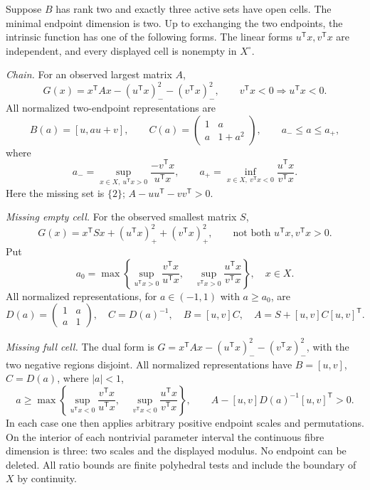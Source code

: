 \begin{theorem}\label{thm:three-cells}
Suppose $B$ has rank two and exactly three active sets have open cells.
The minimal endpoint dimension is two. Up to exchanging the two endpoints,
the intrinsic function has one of the following forms. The linear forms
$u^{\mathsf T}x,v^{\mathsf T}x$ are independent, and every displayed cell
is nonempty in $X^\circ$.

\emph{Chain.} For an observed largest matrix $A$,
\begin{equation}\label{eq:chain-normal}
 G(x)=x^{\mathsf T}Ax-(u^{\mathsf T}x)_-^2-(v^{\mathsf T}x)_-^2,
 \qquad v^{\mathsf T}x<0\Longrightarrow u^{\mathsf T}x<0.
\end{equation}
All normalized two-endpoint representations are
\begin{equation}\label{eq:chain-fibre}
 B(a)=[u,au+v],\qquad C(a)=
 \begin{pmatrix}1&a\\a&1+a^2\end{pmatrix},\qquad a_-\le a\le a_+,
\end{equation}
where
\[
 a_-=\sup_{x\in X,\ u^{\mathsf T}x>0}
       \frac{-v^{\mathsf T}x}{u^{\mathsf T}x},\qquad
 a_+=\inf_{x\in X,\ v^{\mathsf T}x<0}
       \frac{u^{\mathsf T}x}{v^{\mathsf T}x}.
\]
Here the missing set is $\{2\}$; $A-uu^{\mathsf T}-vv^{\mathsf T}>0$.

\emph{Missing empty cell.} For the observed smallest matrix $S$,
\begin{equation}\label{eq:fork-normal}
 G(x)=x^{\mathsf T}Sx+(u^{\mathsf T}x)_+^2+(v^{\mathsf T}x)_+^2,
 \qquad \text{not both }u^{\mathsf T}x,v^{\mathsf T}x>0.
\end{equation}
Put
\[
 a_0=\max\left\{
 \sup_{u^{\mathsf T}x>0}\frac{v^{\mathsf T}x}{u^{\mathsf T}x},\quad
 \sup_{v^{\mathsf T}x>0}\frac{u^{\mathsf T}x}{v^{\mathsf T}x}\right\},
 \quad x\in X.
\]
All normalized representations, for $a\in(-1,1)$ with $a\ge a_0$, are
\begin{equation}\label{eq:fork-fibre}
 D(a)=\begin{pmatrix}1&a\\a&1\end{pmatrix},\quad C=D(a)^{-1},\quad
 B=[u,v]C,\quad A=S+[u,v]C[u,v]^{\mathsf T}.
\end{equation}

\emph{Missing full cell.} The dual form is
$G=x^{\mathsf T}Ax-(u^{\mathsf T}x)_-^2-(v^{\mathsf T}x)_-^2$,
with the two negative regions disjoint. All normalized representations have
$B=[u,v]$, $C=D(a)$, where $|a|<1$,
\[
 a\ge\max\left\{
 \sup_{u^{\mathsf T}x<0}\frac{v^{\mathsf T}x}{u^{\mathsf T}x},\quad
 \sup_{v^{\mathsf T}x<0}\frac{u^{\mathsf T}x}{v^{\mathsf T}x}\right\},
 \qquad A-[u,v]D(a)^{-1}[u,v]^{\mathsf T}>0.
\]
In each case one then applies arbitrary positive endpoint scales and
permutations. On the interior of each nontrivial parameter interval the
continuous fibre dimension is three: two scales and the displayed modulus.
No endpoint can be deleted. All ratio bounds are finite polyhedral tests
and include the boundary of $X$ by continuity.
\end{theorem}
